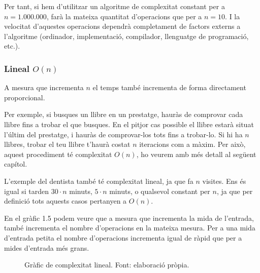Per tant, si hem d'utilitzar un algoritme de complexitat constant per a $n = 1.000.000$, farà la mateixa quantitat d'operacions que per a $n = 10$. I la velocitat d'aquestes operacions dependrà completament de factors externs a l'algoritme (ordinador, implementació, compilador, llenguatge de programació, etc.).

\subsubsection*{Lineal $O(n)$}
A mesura que incrementa $n$ el temps també incrementa de forma directament proporcional.

Per exemple, si busques un llibre en un prestatge, hauràs de comprovar cada llibre fins a trobar el que busques. En el pitjor cas possible el llibre estarà situat l'últim del prestatge, i hauràs de comprovar-los tots fins a trobar-lo. Si hi ha $n$ llibres, trobar el teu llibre t'haurà costat $n$ iteracions com a màxim. Per això, aquest procediment té complexitat $O(n)$, ho veurem amb més detall al següent capítol.

L'exemple del dentista també té complexitat lineal, ja que fa $n$ visites. Ens és igual si tarden $30 \cdot n$ minuts, $5 \cdot n$ minuts, o qualsevol constant per $n$, ja que per definició tots aquests casos pertanyen a $O(n)$. 

En el gràfic 1.5 podem veure que a mesura que incrementa la mida de l'entrada, també incrementa el nombre d'operacions en la mateixa mesura. Per a una mida d'entrada petita el nombre d'operacions incrementa igual de ràpid que per a mides d'entrada més grans. 
\begin{figure}[H]
\centering
{}
    \caption[Gràfic de complexitat lineal.]{Gràfic de complexitat lineal. Font: elaboració pròpia.}
    \label{fig:my_label}
\end{figure}


